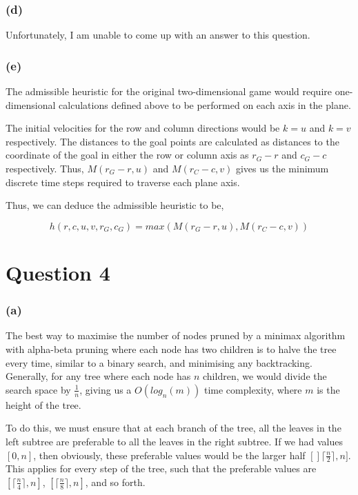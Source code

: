 \documentclass{article}
\begin{document}
\subsubsection*{(d)}
Unfortunately, I am unable to come up with an answer to this question.

\subsubsection*{(e)}
The admissible heuristic for the original two-dimensional game would require one-dimensional calculations defined above to be performed on each axis in the plane. 

The initial velocities for the row and column directions would be $k = u$ and $k = v$ respectively. The distances to the goal points are calculated as distances to the coordinate of the goal in either the row or column axis as $r_G - r$ and $c_G - c$ respectively. Thus, $M(r_G - r, u)$ and $M(r_C - c, v)$ gives us the minimum discrete time steps required to traverse each plane axis.

Thus, we can deduce the admissible heuristic to be,

$$h(r, c, u, v, r_G, c_G) = max(M(r_G - r, u), M(r_C - c, v))$$

\section*{Question 4}

\subsubsection*{(a)}
The best way to maximise the number of nodes pruned by a minimax algorithm with alpha-beta pruning where each node has two children is to halve the tree every time, similar to a binary search, and minimising any backtracking. Generally, for any tree where each node has $n$ children, we would divide the search space by $\frac{1}{n}$, giving us a $O(log_n (m))$ time complexity, where $m$ is the height of the tree.

To do this, we must ensure that at each branch of the tree, all the leaves in the left subtree are preferable to all the leaves in the right subtree. If we had values $[0, n]$, then obviously, these preferable values would be the larger half $[]\lceil \frac{n}{2} \rceil, n]$. This applies for every step of the tree, such that the preferable values are $[\lceil \frac{n}{4} \rceil, n]$, $[\lceil \frac{n}{8} \rceil, n]$, and so forth.
\end{document}
